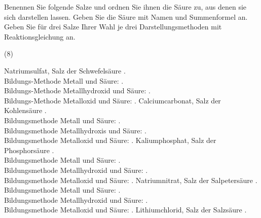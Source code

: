\documentclass[DIV11]{scrartcl}
\begin{document}
\begin{question}[name={Säuren, Basen und Salze I}]
Benennen Sie folgende Salze und ordnen Sie ihnen die Säure zu, aus denen sie
sich darstellen lassen.  Geben Sie die Säure mit Namen und Summenformel
an.  Geben Sie für drei Salze Ihrer Wahl je drei Darstellungsmethoden mit
Reaktionsgleichung an.
\begin{tasks}(8)
  \task {}
  \task {}
  \task {}
  \task {}
  \task {}
  \task {}
  \task {}
  \task {}
\end{tasks}
\end{question}
\begin{solution}[name={Säuren, Basen und Salze I}]
\begin{tasks}
  \task Natriumsulfat, Salz der Schwefelsäure .\\
    Bildungs-Methode Metall und Säure: .\\
    Bildungs-Methode Metallhydroxid und Säure: .\\
    Bildungs-Methode Metalloxid und Säure: .
  \task Calciumcarbonat, Salz der Kohlensäure .\\
    Bildungsmethode Metall und Säure: .\\
    Bildungsmethode Metallhydroxis und Säure: .\\
    Bildungsmethode Metalloxid und Säure: .
  \task Kaliumphosphat, Salz der Phosphorsäure .\\
    Bildungsmethode Metall und Säure: .\\
    Bildungsmethode Metallhydroxid und Säure: .\\
    Bildungsmethode Metalloxid und Säure: .
  \task Natriumnitrat, Salz der Salpetersäure .\\
    Bildungsmethode Metall und Säure: .\\
    Bildungsmethode Metallhydroxid und Säure: .\\
    Bildungsmethode Metalloxid und Säure: .
  \task Lithiumchlorid, Salz der Salzsäure .\\

\end{tasks}
\end{solution}
\end{document}

